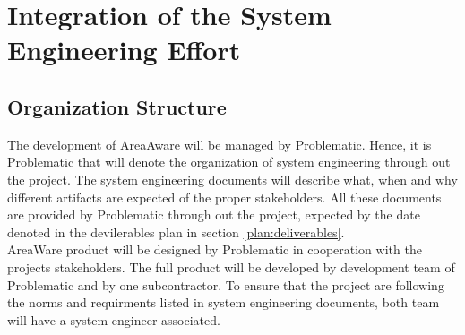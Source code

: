 %
\thispagestyle{fancy}
\chapter{Integration of the System Engineering Effort}
\label{chp:int_se_effort}

\section{Organization Structure}
The development of AreaAware will be managed by Problematic.
Hence, it is Problematic that will denote the organization of system engineering through out the project.
The system engineering documents will describe what, when and why different artifacts are expected of the proper stakeholders.
All these documents are provided by Problematic through out the project, expected by the date denoted in the devilerables plan in section \ref{plan:deliverables}.\\


\noindent AreaWare product will be designed by Problematic in cooperation with the projects stakeholders.
The full product will be developed by development team of Problematic and by one subcontractor.
To ensure that the project are following the norms and requirments listed in system engineering documents, both team will have a system engineer associated.
